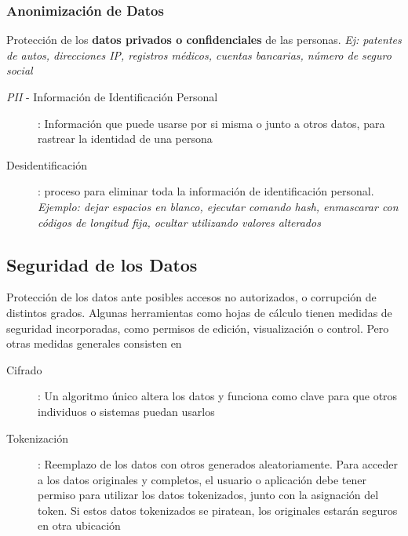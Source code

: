 \subsubsection{Anonimización de Datos}
Protección de los \textbf{datos privados o confidenciales} de las personas. \textit{Ej: patentes de autos, direcciones IP, registros médicos, cuentas bancarias, número de seguro social}
\begin{description}
    \item [\textit{PII} - Información de Identificación Personal]{: Información que puede usarse por si misma o junto a otros datos, para rastrear la identidad de una persona}
    \item [Desidentificación]{: proceso para eliminar toda la información de identificación personal. \textit{Ejemplo: dejar espacios en blanco, ejecutar comando hash, enmascarar con códigos de longitud fija, ocultar utilizando valores alterados}}
\end{description}

\subsection{Seguridad de los Datos}
Protección de los datos ante posibles accesos no autorizados, o corrupción de distintos grados. Algunas herramientas como hojas de cálculo tienen medidas de seguridad incorporadas, como permisos de edición, visualización o control. Pero otras medidas generales consisten en
\begin{description}
    \item [Cifrado]{: Un algoritmo único altera los datos y funciona como clave para que otros individuos o sistemas puedan usarlos}
    \item [Tokenización]{: Reemplazo de los datos con otros generados aleatoriamente. Para acceder a los datos originales y completos, el usuario o aplicación debe tener permiso para utilizar los datos tokenizados, junto con la asignación del token. Si estos datos tokenizados se piratean, los originales estarán seguros en otra ubicación}
\end{description}



\newpage
